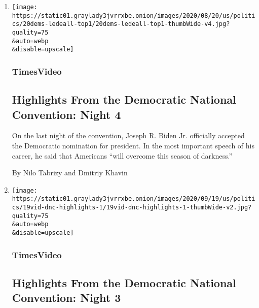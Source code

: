 \begin{enumerate}
\def\labelenumi{\arabic{enumi}.}
\item
  \href{/video/us/politics/100000007299516/democratic-national-convention-highlights.html}{}

  \texttt{[image: https://static01.graylady3jvrrxbe.onion/images/2020/08/20/us/politics/20dems-ledeall-top1/20dems-ledeall-top1-thumbWide-v4.jpg?quality=75\\\&auto=webp\\\&disable=upscale]}

  \hypertarget{timesvideo}{%
  \subsubsection{TimesVideo}\label{timesvideo}}

  \hypertarget{highlights-from-the-democratic-national-convention-night-4}{%
  \subsection{Highlights From the Democratic National Convention: Night
  4}\label{highlights-from-the-democratic-national-convention-night-4}}

  On the last night of the convention, Joseph R. Biden Jr. officially
  accepted the Democratic nomination for president. In the most
  important speech of his career, he said that Americans ``will overcome
  this season of darkness.''

  By Nilo Tabrizy and Dmitriy Khavin
\item
  \href{/video/us/politics/100000007297733/democratic-national-convention-highlights.html}{}

  \texttt{[image: https://static01.graylady3jvrrxbe.onion/images/2020/09/19/us/politics/19vid-dnc-highlights-1/19vid-dnc-highlights-1-thumbWide-v2.jpg?quality=75\\\&auto=webp\\\&disable=upscale]}

  \hypertarget{timesvideo-1}{%
  \subsubsection{TimesVideo}\label{timesvideo-1}}

  \hypertarget{highlights-from-the-democratic-national-convention-night-3}{%
  \subsection{Highlights From the Democratic National Convention: Night
  3}\label{highlights-from-the-democratic-national-convention-night-3}}


\end{enumerate}
